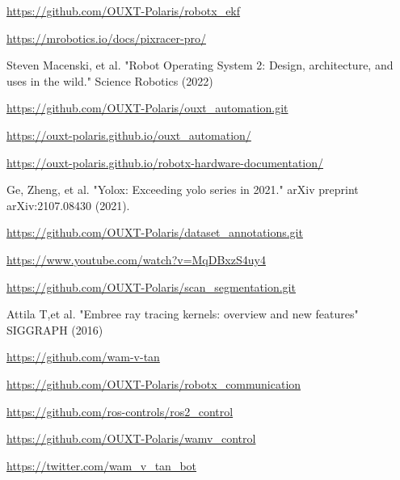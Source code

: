 \documentclass[lettersize,journal]{IEEEtran}
\begin{document}
\begin{thebibliography}{1}

    \url{https://github.com/OUXT-Polaris/robotx_ekf}

    \url{https://mrobotics.io/docs/pixracer-pro/}

    Steven Macenski, et al. "Robot Operating System 2: Design, architecture, and uses in the wild." Science Robotics (2022)

    \url{https://github.com/OUXT-Polaris/ouxt_automation.git}

    \url{https://ouxt-polaris.github.io/ouxt_automation/}

    \url{https://ouxt-polaris.github.io/robotx-hardware-documentation/}

    Ge, Zheng, et al. "Yolox: Exceeding yolo series in 2021." arXiv preprint arXiv:2107.08430 (2021).

    \url{https://github.com/OUXT-Polaris/dataset_annotations.git}

    \url{https://www.youtube.com/watch?v=MqDBxzS4uy4}

    \url{https://github.com/OUXT-Polaris/scan_segmentation.git}

    Attila T,et al. "Embree ray tracing kernels: overview and new features" SIGGRAPH (2016)

    \url{https://github.com/wam-v-tan}

    \url{https://github.com/OUXT-Polaris/robotx_communication}

    \url{https://github.com/ros-controls/ros2_control}

    \url{https://github.com/OUXT-Polaris/wamv_control}

    \url{https://twitter.com/wam_v_tan_bot}

\end{thebibliography}

\vfill
\end{document}
